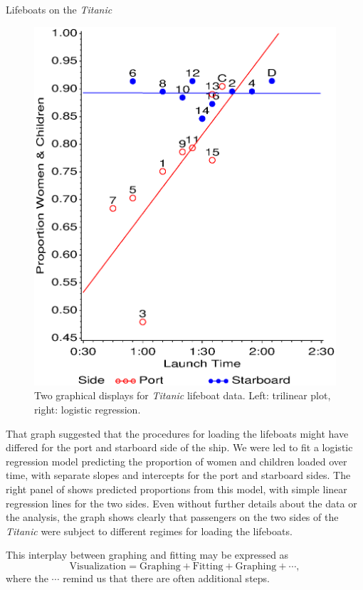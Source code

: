 \begin{Example}[lifeboat0]{Lifeboats on the \emph{Titanic}}
\begin{figure}[htb]
\begin{minipage}[c]{.49\linewidth}
  \includegraphics[width=1\linewidth,clip]{ch1/fig/lifeboat3}
 \end{minipage}
 \caption[Two graphical displays for \emph{Titanic} lifeboat data]{Two graphical displays for \emph{Titanic} lifeboat data. Left: trilinear plot, right: logistic regression.}\label{fig:lifeboat}
\end{figure}

That graph suggested that the procedures for loading the lifeboats
might have differed for the port and starboard side of the ship.
We were led to fit a logistic regression model predicting the
proportion of women and children loaded over time, with separate
slopes and intercepts for the port and starboard sides.
The right panel of  shows predicted proportions
from this model, with simple linear regression lines for the
two sides.  Even without further details about the data or
the analysis, the graph shows clearly that passengers on the two
sides of the \emph{Titanic} were subject to different regimes
for loading the lifeboats.
\end{Example}

This interplay between graphing and fitting may be expressed as
\begin{equation*}
\textrm{Visualization} = \textrm{Graphing} + \textrm{Fitting} + \textrm{Graphing} + \cdots
\comma
\end{equation*}
where the $\cdots$ remind us that there are often additional steps.

